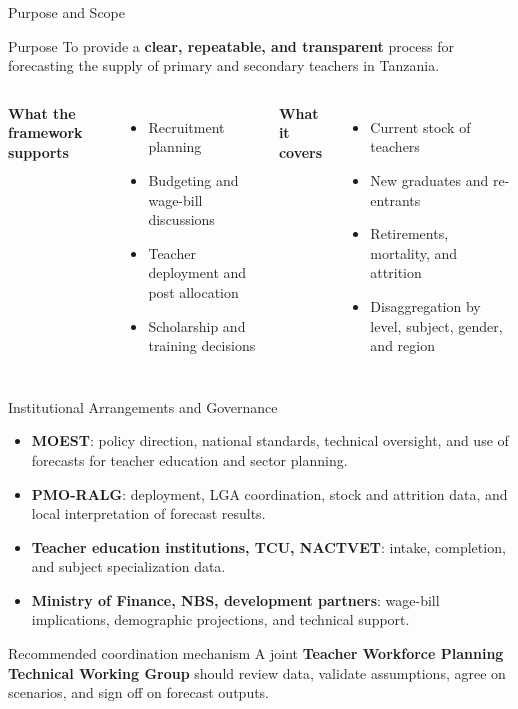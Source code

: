 \documentclass[
  11pt,
  ignorenonframetext,
  aspectratio=169,
  11pt]{beamer}
\newcommand{\highlight}[1]{\textcolor{DavidsonBlueDark}{\textbf{#1}}}
\begin{document}
\begin{frame}{Purpose and Scope}
\begin{block}{Purpose}
\justifying
To provide a \highlight{clear, repeatable, and transparent} process for forecasting the supply of primary and secondary teachers in Tanzania.
\end{block}
\vspace{0.15cm}
\begin{columns}[T,onlytextwidth]
\textbf{What the framework supports}
\begin{itemize}
  \item Recruitment planning
  \item Budgeting and wage-bill discussions
  \item Teacher deployment and post allocation
  \item Scholarship and training decisions
\end{itemize}
\textbf{What it covers}
\begin{itemize}
  \item Current stock of teachers
  \item New graduates and re-entrants
  \item Retirements, mortality, and attrition
  \item Disaggregation by level, subject, gender, and region
\end{itemize}
\end{columns}
\end{frame}

\begin{frame}{Institutional Arrangements and Governance}
\begin{itemize}
  \item \highlight{MOEST}: policy direction, national standards, technical oversight, and use of forecasts for teacher education and sector planning.
  \item \highlight{PMO-RALG}: deployment, LGA coordination, stock and attrition data, and local interpretation of forecast results.
  \item \highlight{Teacher education institutions, TCU, NACTVET}: intake, completion, and subject specialization data.
  \item \highlight{Ministry of Finance, NBS, development partners}: wage-bill implications, demographic projections, and technical support.
\end{itemize}
\vspace{0.25cm}
\begin{block}{Recommended coordination mechanism}
A joint \highlight{Teacher Workforce Planning Technical Working Group} should review data, validate assumptions, agree on scenarios, and sign off on forecast outputs.
\end{block}
\end{frame}
\end{document}
